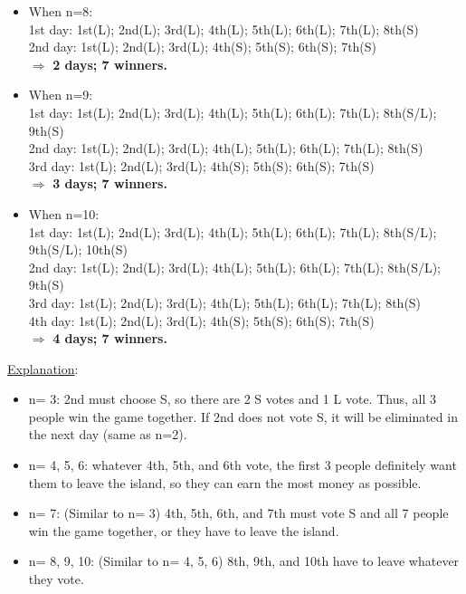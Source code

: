 \documentclass[12pt]{article}
\begin{document}
\begin{itemize}
    \item When n=8:\\
    1st day: 1st(L); 2nd(L); 3rd(L); 4th(L); 5th(L); 6th(L); 7th(L); 8th(S) \\
    2nd day: 1st(L); 2nd(L); 3rd(L); 4th(S); 5th(S); 6th(S); 7th(S) \\
    $\Longrightarrow$ \textbf{2 days; 7 winners.}
    
    \item When n=9:\\
    1st day: 1st(L); 2nd(L); 3rd(L); 4th(L); 5th(L); 6th(L); 7th(L); 8th(S/L); 9th(S) \\
    2nd day: 1st(L); 2nd(L); 3rd(L); 4th(L); 5th(L); 6th(L); 7th(L); 8th(S) \\
    3rd day: 1st(L); 2nd(L); 3rd(L); 4th(S); 5th(S); 6th(S); 7th(S) \\
    $\Longrightarrow$ \textbf{3 days; 7 winners.}
    
    \item When n=10:\\
    1st day: 1st(L); 2nd(L); 3rd(L); 4th(L); 5th(L); 6th(L); 7th(L); 8th(S/L); 9th(S/L); 10th(S) \\
    2nd day: 1st(L); 2nd(L); 3rd(L); 4th(L); 5th(L); 6th(L); 7th(L); 8th(S/L); 9th(S) \\
    3rd day: 1st(L); 2nd(L); 3rd(L); 4th(L); 5th(L); 6th(L); 7th(L); 8th(S) \\
    4th day: 1st(L); 2nd(L); 3rd(L); 4th(S); 5th(S); 6th(S); 7th(S) \\
    $\Longrightarrow$ \textbf{4 days; 7 winners.}
    
\end{itemize}
\underline{Explanation}:
\begin{itemize}
    \item n= 3: 2nd must choose S, so there are 2 S votes and 1 L vote. Thus, all 3 people win the game together. If 2nd does not vote S, it will be eliminated in the next day (same as n=2).
    
    \item n= 4, 5, 6: whatever 4th, 5th, and 6th vote, the first 3 people definitely want them to leave the island, so they can earn the most money as possible.
    
    \item n= 7: (Similar to n= 3) 4th, 5th, 6th, and 7th must vote S and all 7 people win the game together, or they have to leave the island.
    
    \item n= 8, 9, 10: (Similar to n= 4, 5, 6) 8th, 9th, and 10th have to leave whatever they vote.


\end{itemize}
\end{document}
